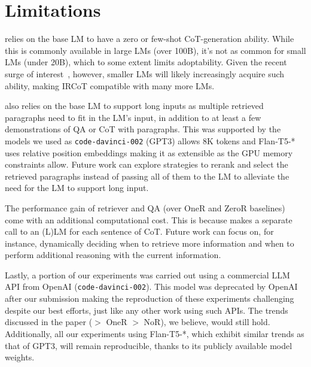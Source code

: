 \section*{Limitations}
\label{sec:limitations}

\iconsys relies on the base LM to have a zero or few-shot CoT-generation ability.  While this is commonly available in large LMs (over 100B), it's not as common for small LMs (under 20B), which to some extent limits \iconsys adoptability. Given the recent surge of interest~\cite{ul2,reasoningdistillation1,reasoningdistillation2}, however, smaller LMs will likely increasingly acquire such ability, making IRCoT compatible with many more LMs.

\iconsys also relies on the base LM to support long inputs as multiple retrieved paragraphs need to fit in the LM's input, in addition to at least a few demonstrations of QA or CoT with paragraphs. This was supported by the models we used as \texttt{code-davinci-002} (GPT3) allows 8K tokens and Flan-T5-* uses relative position embeddings making it as extensible as the GPU memory constraints allow. Future work can explore strategies to rerank and select the retrieved paragraphs instead of passing all of them to the LM to alleviate the need for the LM to support long input.

The performance gain of \iconsys retriever and QA (over OneR and ZeroR baselines) come with an additional computational cost. This is because \iconsys makes a separate call to an (L)LM for each sentence of CoT. Future work can focus on, for instance, dynamically deciding when to retrieve more information and when to perform additional reasoning with the current information.

Lastly, a portion of our experiments was carried out using a commercial LLM API from OpenAI (\texttt{code-davinci-002}). This model was deprecated by OpenAI after our submission making the reproduction of these experiments challenging despite our best efforts, just like any other work using such APIs. The trends discussed in the paper (\iconsys $>$ OneR $>$ NoR), we believe, would still hold. Additionally, all our experiments using Flan-T5-*, which exhibit similar trends as that of GPT3, will remain reproducible, thanks to its publicly available model weights.
